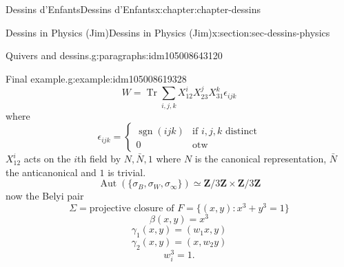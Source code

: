 \documentclass[oneside,10pt,]{book}
\numberwithin{equation}{section}
\newcommand{\ZZ}{\mathbf{Z}}
\DeclareMathOperator{\sgn}{sgn}
\DeclareMathOperator{\trace}{Tr}
\DeclareMathOperator{\Aut}{Aut}
\newcommand{\amp}{&}
\begin{document}
\begin{chapterptx}{Dessins d'Enfants}{}{Dessins d'Enfants}{}{}{x:chapter:chapter-dessins}
\begin{sectionptx}{Dessins in Physics (Jim)}{}{Dessins in Physics (Jim)}{}{}{x:section:sec-dessins-physics}
\begin{paragraphs}{Quivers and dessins.}{g:paragraphs:idm105008643120}
\begin{example}{Final example.}{g:example:idm105008619328}
\begin{equation*}
W = \trace \sum_{i,j,k} X_{12}^iX_{23}^j X_{31}^k \epsilon_{ijk}
\end{equation*}
where%
\begin{equation*}
\epsilon_{ijk} = \begin{cases} \sgn(ijk) \amp\text{if }i,j,k \text{ distinct}\\ 0 \amp\text{otw}\end{cases}
\end{equation*}
\(X_{12}^i\) acts on the \(i\)th field by \(N, \bar N, 1\) where \(N\) is the canonical representation, \(\bar N\) the anticanonical and \(1\) is trivial.%
\begin{equation*}
\Aut(\{\sigma_B,\sigma_W, \sigma_\infty\})  \simeq \ZZ/3\ZZ\times \ZZ/3\ZZ
\end{equation*}
now the Belyi pair%
\begin{equation*}
\Sigma = \text{projective closure of } F = \{(x,y) : x^3+ y^3 =1\}
\end{equation*}
%
\begin{equation*}
\beta(x,y) = x^3
\end{equation*}
%
\begin{equation*}
\gamma_1(x,y) = (w_1 x, y)
\end{equation*}
%
\begin{equation*}
\gamma_2(x,y) = (x,w_2  y)
\end{equation*}
%
\begin{equation*}
w_i^3 = 1\text{.}
\end{equation*}
%
\end{example}
\end{paragraphs}%
\end{sectionptx}
\end{chapterptx}
%
%
\typeout{************************************************}
\typeout{************************************************}
%
\end{document}
